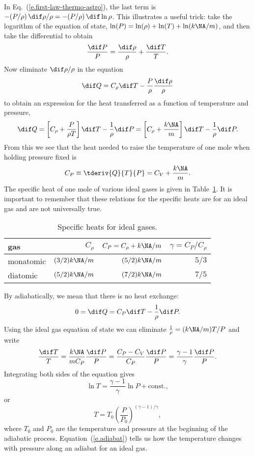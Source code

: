 In Eq.~(\ref{e.first-law-thermo-astro}), the last term is $-(P/\rho)\, \dif\rho/\rho = -(P/\rho)\,\dif\ln\rho$. This illustrates a useful trick: take the logarithm of the equation of state, $\ln (P) = \ln(\rho) + \ln (T) + \ln (k\NA/m)$, and then take the differential to obtain
\[ \frac{\dif P}{P} = \frac{\dif\rho}{\rho} + \frac{\dif T}{T}. \]
Now eliminate $\dif\rho/\rho$ in the equation
\[ \dif Q = C_{\rho}\dif T - \frac{P}{\rho}\frac{\dif\rho}{\rho} \]
to obtain an expression for the heat transferred as a function of temperature and pressure,
\[ \dif Q = \left[C_{\rho} + \frac{P}{\rho T}\right]\dif T - \frac{1}{\rho}\dif P
	 = \left[C_{\rho} + \frac{k\NA}{m}\right]\dif T - \frac{1}{\rho}\dif P. \]
From this we see that the heat needed to raise the temperature of one mole when holding pressure fixed is
\begin{equation}\label{e.CP}
C_{P}\equiv \tderiv{Q}{T}{P} = C_{V} + \frac{k\NA}{m}.
\end{equation}
The specific heat of one mole of various ideal gases is given in Table~\ref{t.specific-heat}.
It is important to remember that these relations for the specific heats are for an ideal gas and are not universally true.
\begin{table}
\caption{Specific heats for ideal gases.\label{t.specific-heat}}
\begin{tabular}{lrrr}
gas & $C_{\rho}$ & $C_{P}=C_{\rho}+k\NA/m$ & $\gamma = C_{P}/C_{\rho}$\\
\hline
monatomic & $(3/2) k\NA/m$ & $(5/2)k\NA/m$ & $5/3$\\
diatomic & $(5/2) k\NA/m$ & $(7/2)k\NA/m$ & $7/5$\\
\end{tabular}
\end{table}

  By adiabatically, we mean that there is no heat exchange:
\[ 0 = \dif Q = C_{P}\dif T - \frac{1}{\rho} \dif P.\]
Using the ideal gas equation of state we can eliminate $\frac{1}{\rho} = (k\NA/m) T/P$ and write
\[ \frac{\dif T}{T} = \frac{k\NA}{mC_{P}} \frac{\dif P}{P} = \frac{C_{P}-C_{V}}{C_{P}} \frac{\dif P}{P} = \frac{\gamma-1}{\gamma}\frac{\dif P}{P}. \]
Integrating both sides of the equation gives
\[ \ln T = \frac{\gamma-1}{\gamma}\ln P + \textrm{const.},\]
or 
\begin{equation}\label{e.adiabat}
 T = T_{0}\left(\frac{P}{P_{0}}\right)^{(\gamma-1)/\gamma},
\end{equation}
where $T_{0}$ and $P_{0}$ are the temperature and pressure at the beginning of the adiabatic process.
Equation~(\ref{e.adiabat}) tells us how the temperature changes with pressure along an adiabat for an ideal gas.

